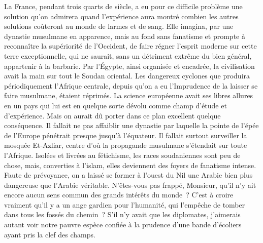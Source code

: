 \documentclass[french,twoside]{book} %
\newcommand\orgName[1]{#1}
\newcommand\placeName[1]{#1}
\begin{document}
La {\orgName France}, pendant trois quarts de siècle, a eu pour ce difficile problème une solution qu’on admirera quand l’expérience aura montré combien les autres solutions coûteront au monde de larmes et de sang. Elle imagina, par une dynastie musulmane en apparence, mais au fond sans fanatisme et prompte à reconnaître la supériorité de l’{\orgName Occident}, de faire régner l’esprit moderne sur cette terre exceptionnelle, qui ne saurait, sans un détriment extrême du bien général, appartenir à la barbarie. Par l’{\placeName Égypte}, ainsi organisée et encadrée, la civilisation avait la main sur tout le {\placeName Soudan oriental}. Les dangereux cyclones que produira périodiquement l’{\orgName Afrique centrale}, depuis qu’on a eu l’Imprudence de la laisser se faire musulmane, étaient réprimés. La science européenne avait ses libres allures en un pays qui lui est en quelque sorte dévolu comme champ d’étude et d’expérience. Mais on aurait dû porter dans ce plan excellent quelque conséquence. Il fallait ne pas affaiblir une dynastie par laquelle la pointe de l’épée de l’{\orgName Europe} pénétrait presque jusqu’à l’{\placeName équateur}. Il fallait surtout surveiller la {\placeName mosquée Et-Azliar}, centre d’où la propagande musulmane s’étendait sur toute l’{\placeName Afrique}. Isolées et livrées au fétichisme, les races soudaniennes sont peu de chose, mais, converties à l’islam, elles deviennent des foyers de fanatisme intense. Faute de prévoyance, on a laissé se former à l’ouest du {\placeName Nil} une {\placeName Arabie} bien plus dangereuse que l’{\placeName Arabie} véritable. N’êtes-vous pas frappé, Monsieur, qu’il n’y ait encore aucun sens commun des grands intérêts du monde ? C’est à croire vraiment qu’il y a un ange gardien pour l’humanité, qui l’empêche de tomber dans tous les fossés du chemin ? S’il n’y avait que les diplomates, j’aimerais autant voir notre pauvre espèce confiée à la prudence d’une bande d’écoliers ayant pris la clef des champs.\par
\end{document}
